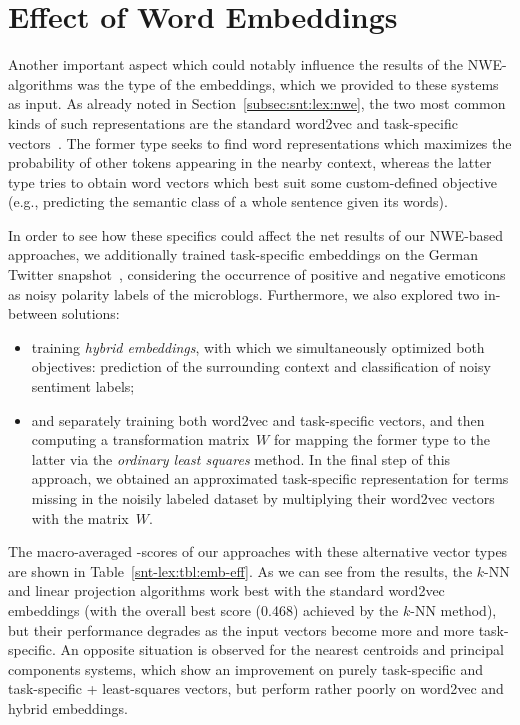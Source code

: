 \section{Effect of Word Embeddings}\label{subsec:snt-lex:eowet}

Another important aspect which could notably influence the results of
the NWE-algorithms was the type of the embeddings, which we provided
to these systems as input.  As already noted in
Section~\ref{subsec:snt:lex:nwe}, the two most common kinds of such
representations are the standard word2vec and task-specific
vectors~\cite{Mikolov:13,Collobert:11}.  The former type seeks to find
word representations which maximizes the probability of other tokens
appearing in the nearby context, whereas the latter type tries to
obtain word vectors which best suit some custom-defined objective
(e.g., predicting the semantic class of a whole sentence given its
words).

In order to see how these specifics could affect the net results of
our NWE-based approaches, we additionally trained task-specific
embeddings on the German Twitter snapshot~\cite{Scheffler:14},
considering the occurrence of positive and negative emoticons as noisy
polarity labels of the microblogs.  Furthermore, we also explored two
in-between solutions:
\begin{itemize}
\item training \emph{hybrid embeddings}, with which we simultaneously
  optimized both objectives: prediction of the surrounding context and
  classification of noisy sentiment labels;
\item and separately training both word2vec and task-specific vectors,
  and then computing a transformation matrix~$W$ for mapping the
  former type to the latter via the \emph{ordinary least squares}
  method.  In the final step of this approach, we obtained an
  approximated task-specific representation for terms missing in the
  noisily labeled dataset by multiplying their word2vec vectors with
  the matrix~$W$.
\end{itemize}

The macro-averaged \F-scores of our approaches with these alternative
vector types are shown in Table~\ref{snt-lex:tbl:emb-eff}.  As we can
see from the results, the $k$-NN and linear projection algorithms work
best with the standard word2vec embeddings (with the overall best
score (0.468) achieved by the $k$-NN method), but their performance
degrades as the input vectors become more and more task-specific.  An
opposite situation is observed for the nearest centroids and principal
components systems, which show an improvement on purely task-specific
and task-specific + least-squares vectors, but perform rather poorly
on word2vec and hybrid embeddings.


